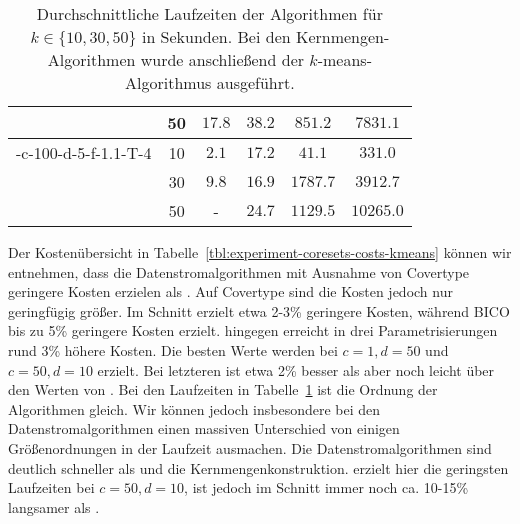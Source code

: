 \begin{table}[h]
\begin{tabular}{@{}cccccc@{}}
		 						& 50 & $17.8$ 			& $38.2$ 			& $851.2$ 				& $7831.1$ \\
	\midrule
	\CsTwo-c-100-d-5-f-1.1-T-4	& 10 & $2.1$ 			& $17.2$ 			& $41.1$ 				& $331.0$ \\
			 					& 30 & $9.8$ 			& $16.9$			& $1787.7$ 				& $3912.7$ \\
		 						& 50 & - 				& $24.7$ 			& $1129.5$ 				& $10265.0$ \\
	\bottomrule
\end{tabular}
\caption{Durchschnittliche Laufzeiten der Algorithmen für $k \in \{ 10, 30, 50 \}$ in Sekunden. Bei den Kernmengen-Algorithmen
wurde anschließend der $k$-means-Algorithmus ausgeführt.}
\label{tbl:experiment-coresets-runtime-kmeans}
\end{table}
Der Kostenübersicht in Tabelle~\ref{tbl:experiment-coresets-costs-kmeans} können wir entnehmen, dass die Datenstromalgorithmen
mit Ausnahme von Covertype geringere Kosten erzielen als \kmpp. Auf Covertype sind die Kosten jedoch nur geringfügig größer.
Im Schnitt erzielt \Skmpp{} etwa 2-3\% geringere Kosten, während BICO bis zu 5\% geringere Kosten erzielt. \CsTwo{} hingegen
erreicht in drei Parametrisierungen rund 3\% höhere Kosten. Die besten Werte werden bei $c=1, d=50$ und $c=50, d=10$ erzielt.
Bei letzteren ist \CsTwo{} etwa 2\% besser als \kmpp{} aber noch leicht über den Werten von \Skmpp.
Bei den Laufzeiten in Tabelle~\ref{tbl:experiment-coresets-runtime-kmeans} ist die Ordnung der Algorithmen gleich.
Wir können jedoch insbesondere bei den Datenstromalgorithmen einen massiven Unterschied von einigen Größenordnungen in der
Laufzeit ausmachen. Die Datenstromalgorithmen sind deutlich schneller als \kmpp{} und die Kernmengenkonstruktion.
\CsTwo{} erzielt hier die geringsten Laufzeiten bei $c=50, d=10$, ist jedoch im Schnitt immer noch ca. 10-15\% langsamer als \kmpp.

